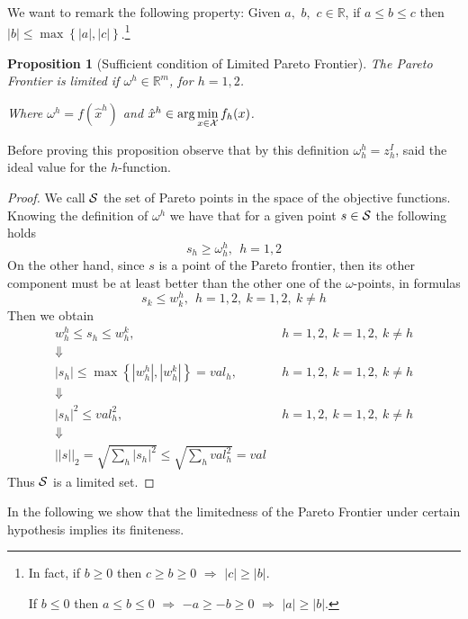 \documentclass{article}
\newtheorem{proposition}[theorem]{Proposition}
\def\setR{\mathbb{R}}
\def\ds{\displaystyle}
\def\X{{\cal X}}
\begin{document}
	    
	    We want to remark the following property: Given $a,$ $b,$ $c \in \setR$, if $ a \le b \le c$ then $|b| \le \max\left\{|a|,|c| \right\}$.\footnote{ In fact, if  $b \ge 0$ then $c \ge b \ge 0$ $\Rightarrow$ $|c| \ge |b|$.
	    	
	    	If  $b \le 0$ then $a \le b \le 0$ $\Rightarrow$ $-a \ge -b \ge 0$ $\Rightarrow$ $|a| \ge |b|$.}
	    \begin{proposition}[Sufficient condition of Limited Pareto Frontier]
	    	The Pareto Frontier is limited if  $\omega^h \in \setR^m$, for $h = 1,2$.
	    	
	    	Where $\omega^h = f(\hat{x}^h)$ and
	    	$ \hat{x}^h \in \ds \arg\min_{x \in \X} f_h(x)$.
	    \end{proposition}
	    Before proving this proposition observe that by this definition $ \omega^h_h = z_h^I$, said the ideal value for the $h$-function.
	    \begin{proof}
	    	We call $\cal S$ the set of Pareto points in the space of the objective functions. Knowing the definition of $\omega^h$ we have that for a given point $s \in \cal S$ the following holds
	    	$$s_h \ge \omega_h^h,\  \ h = 1,2$$
	    	On the other hand, since $s$ is a point of the Pareto frontier, then its other component must be at least better than the other one of the $\omega$-points, in formulas
	    	$$s_k \le w_k^h, \ \ h = 1,2,\ k=1,2,\ k\neq h$$
	    	Then we obtain 
	    	$$ \begin{array}{cl}
	    	w_h^h \le s_h \le w^k_h,&\ \ h = 1,2,\ k=1,2,\ k\neq h \\
	    	\Downarrow \\
	    	|s_h| \le \ds\max\left\{|w_h^h|, |w_h^k|\right\} = val_h,& \ \  h = 1,2,\ k=1,2,\ k\neq h\\
	    	\Downarrow \\
	    	|s_h|^2 \le val_h^2,& \ \  h = 1,2,\ k=1,2,\ k\neq h\\
	    	\Downarrow \\
	    	||s||_2 = \ds\sqrt{\sum_h{|s_h|^2}} \le \sqrt{\sum_h{val_h^2}} = val  
	    	\end{array}$$
	    	Thus $\cal S$ is a limited set.
	    \end{proof}
	    \medskip
	    
	    In the following we show that the limitedness of the Pareto Frontier under certain hypothesis implies its finiteness.
	    
\end{document}
